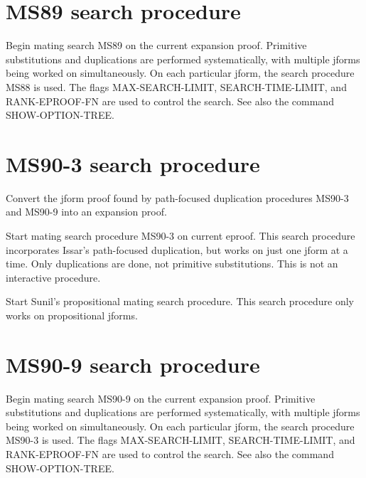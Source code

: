 \section{MS89 search procedure}

\begin{description} 
\item[MS89]  
Begin mating search MS89 on the current expansion proof.
Primitive substitutions and duplications are performed systematically,
with multiple jforms being worked on simultaneously.  On each
particular jform, the search procedure MS88 is used.  The flags
MAX-SEARCH-LIMIT, SEARCH-TIME-LIMIT, and RANK-EPROOF-FN are used to
control the search.  See also the command SHOW-OPTION-TREE.
\item
\end{description}

\section{MS90-3 search procedure}

\begin{description} 
\item[EXPAND-ETREE]  
Convert the jform proof found by path-focused duplication
procedures MS90-3 and MS90-9 into an expansion proof.

\item[MS90-3]  
Start mating search procedure MS90-3 on current eproof.
This search procedure incorporates Issar's path-focused duplication,
but works on just one jform at a time.  Only duplications are done,
not primitive substitutions.  This is not an interactive procedure.

\item[PROP-MSEARCH]  
Start Sunil's propositional mating search procedure.
This search procedure only works on propositional jforms.
\item
\end{description}

\section{MS90-9 search procedure}

\begin{description} 
\item[MS90-9]  
Begin mating search MS90-9 on the current expansion proof.
Primitive substitutions and duplications are performed systematically,
with multiple jforms being worked on simultaneously.  On each
particular jform, the search procedure MS90-3 is used.  The flags
MAX-SEARCH-LIMIT, SEARCH-TIME-LIMIT, and RANK-EPROOF-FN are used to
control the search.  See also the command SHOW-OPTION-TREE.
\item
\end{description}

